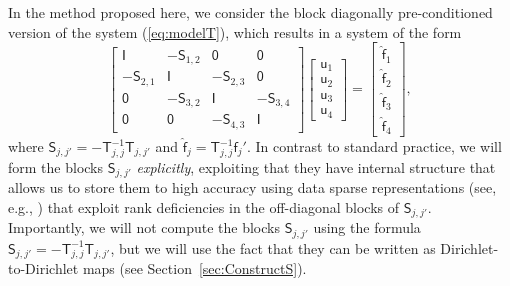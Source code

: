 \documentclass[final,onefignum,onetabnum]{siamart250211}
\newcommand{\vct}[1]{\bm{\mathsf{#1}}}
\newcommand{\mtx}[1]{\bm{\mathsf{#1}}}
\theoremstyle{definition}
\begin{document}
In the method proposed here, we consider the block diagonally pre-conditioned
version of the system (\ref{eq:modelT}), which results in a system of the form
\begin{equation}
\label{eq:modelS}
\left[\begin{array}{rrrr}
 \mtx{I}       & -\mtx{S}_{1,2} &  \mtx{0}       &  \mtx{0}       \\
-\mtx{S}_{2,1} &  \mtx{I}       & -\mtx{S}_{2,3} &  \mtx{0}       \\
 \mtx{0}       & -\mtx{S}_{3,2} &  \mtx{I}       & -\mtx{S}_{3,4} \\
 \mtx{0}       &  \mtx{0}       & -\mtx{S}_{4,3} &  \mtx{I}
\end{array}\right]
\left[\begin{array}{rrrr}
\vct{u}_{1} \\ \vct{u}_{2} \\ \vct{u}_{3} \\ \vct{u}_{4}
\end{array}\right]
=
\left[\begin{array}{rrrr}
\widehat{\vct{f}}_{1} \\ \widehat{\vct{f}}_{2} \\ \widehat{\vct{f}}_{3} \\ \widehat{\vct{f}}_{4}
\end{array}\right],
\end{equation}
where $\mtx{S}_{j,j'} = -\mtx{T}_{j,j}^{-1}\mtx{T}_{j,j'}$ and
$\widehat{\vct{f}}_{j} = \mtx{T}_{j,j}^{-1}\vct{f}_{j}'$. In contrast to standard practice, we will form the blocks $\mtx{S}_{j,j'}$ \textit{explicitly}, exploiting that they
have internal structure that allows us to store them to
high accuracy using data sparse representations
(see, e.g., \cite{hackbusch,2008_bebendorf_book,2002_hackbusch_H2,2004_borm_hackbusch,2010_borm_book,2005_martinsson_fastdirect,2012_martinsson_FDS_survey,2009_xia_superfast,2013_xia_randomized,2010_gu_xia_HSS,2016_kressner_rankstructured_review})
that exploit rank deficiencies in the off-diagonal blocks of $\mtx{S}_{j,j'}$. Importantly, we will not compute the blocks $\mtx{S}_{j,j'}$ using the formula $\mtx{S}_{j,j'} = -\mtx{T}_{j,j}^{-1}\mtx{T}_{j,j'}$, but we will use the fact that they can be written as Dirichlet-to-Dirichlet maps (see Section~\ref{sec:ConstructS}).
\end{document}
